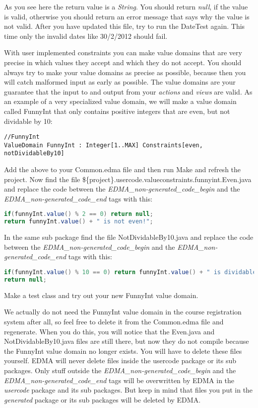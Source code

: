 As you see here the return value is a \emph{String}. You should return
\emph{null}, if the value is valid, otherwise you should return an
error message that says why the value is not valid. After you have
updated this file, try to run the DateTest again. This time only the
invalid dates like 30/2/2012 should fail.

With user implemented constraints you can make value domains that
are very precise in which values they accept and which they do not
accept. You should always try to make your value domains as precise
as possible, because then you will catch malformed input as early
as possible. The value domains are your guarantee that the input to
and output from your \emph{actions} and \emph{views} are valid. As
an example of a very specialized value domain, we will make a value
domain called FunnyInt that only contains positive integers that are
even, but not dividable by 10:

\begin{lstlisting}[basicstyle={\scriptsize}]
//FunnyInt
ValueDomain FunnyInt : Integer[1..MAX] Constraints[even, notDividableBy10]
\end{lstlisting}


Add the above to your Common.edma file and then run Make and refresh
the project. Now find the file \$\{project\}.usercode.valueconstraints.funnyint.Even.java
and replace the code between the \emph{EDMA\_non-generated\_code\_begin}
and the \emph{EDMA\_non-generated\_code\_end} tags with this:

\begin{lstlisting}[basicstyle={\scriptsize},language=Java,tabsize=2]
if(funnyInt.value() % 2 == 0) return null;
return funnyInt.value() + " is not even!";
\end{lstlisting}


In the same sub package find the file NotDividableBy10.java and replace
the code between the \emph{EDMA\_non-generated\_code\_begin} and the
\emph{EDMA\_non-generated\_code\_end} tags with this:

\begin{lstlisting}[basicstyle={\scriptsize},language=Java,tabsize=2]
if(funnyInt.value() % 10 == 0) return funnyInt.value() + " is dividable by 10!";
return null;
\end{lstlisting}


Make a test class and try out your new FunnyInt value domain.

We actually do not need the FunnyInt value domain in the course registration
system after all, so feel free to delete it from the Common.edma file
and regenerate. When you do this, you will notice that the Even.java
and NotDividableBy10.java files are still there, but now they do not
compile because the FunnyInt value domain no longer exists. You will
have to delete these files yourself. EDMA will never delete files
inside the usercode package or its sub packages. Only stuff outside
the \emph{EDMA\_non-generated\_code\_begin} and the \emph{EDMA\_non-generated\_code\_end}
tags will be overwritten by EDMA in the \emph{usercode} package and
its sub packages. But keep in mind that files you put in the \emph{generated}
package or its sub packages will be deleted by EDMA.

